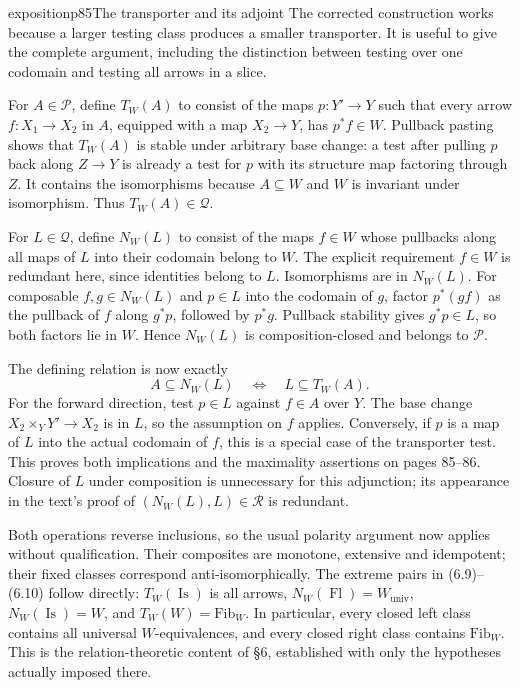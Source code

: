 \begin{dcomment}{exposition}{p85}{The transporter and its adjoint}
The corrected construction works because a larger testing class produces a smaller transporter. It is useful to give the complete argument, including the distinction between testing over one codomain and testing all arrows in a slice.

For $A\in\mathcal P$, define $T_W(A)$ to consist of the maps $p:Y'\to Y$ such that every arrow $f:X_1\to X_2$ in $A$, equipped with a map $X_2\to Y$, has $p^*f\in W$. Pullback pasting shows that $T_W(A)$ is stable under arbitrary base change: a test after pulling $p$ back along $Z\to Y$ is already a test for $p$ with its structure map factoring through $Z$. It contains the isomorphisms because $A\subseteq W$ and $W$ is invariant under isomorphism. Thus $T_W(A)\in\mathcal Q$.

For $L\in\mathcal Q$, define $N_W(L)$ to consist of the maps $f\in W$ whose pullbacks along all maps of $L$ into their codomain belong to $W$. The explicit requirement $f\in W$ is redundant here, since identities belong to $L$. Isomorphisms are in $N_W(L)$. For composable $f,g\in N_W(L)$ and $p\in L$ into the codomain of $g$, factor $p^*(gf)$ as the pullback of $f$ along $g^*p$, followed by $p^*g$. Pullback stability gives $g^*p\in L$, so both factors lie in $W$. Hence $N_W(L)$ is composition-closed and belongs to $\mathcal P$.

The defining relation is now exactly
\[
 A\subseteq N_W(L)\quad\Longleftrightarrow\quad L\subseteq T_W(A).
\]
For the forward direction, test $p\in L$ against $f\in A$ over $Y$. The base change $X_2\times_Y Y'\to X_2$ is in $L$, so the assumption on $f$ applies. Conversely, if $p$ is a map of $L$ into the actual codomain of $f$, this is a special case of the transporter test. This proves both implications and the maximality assertions on pages 85--86. Closure of $L$ under composition is unnecessary for this adjunction; its appearance in the text's proof of $(N_W(L),L)\in\mathcal R$ is redundant.

Both operations reverse inclusions, so the usual polarity argument now applies without qualification. Their composites are monotone, extensive and idempotent; their fixed classes correspond anti-isomorphically. The extreme pairs in (6.9)--(6.10) follow directly: $T_W(\operatorname{Is})$ is all arrows, $N_W(\operatorname{Fl})=W_{\mathrm{univ}}$, $N_W(\operatorname{Is})=W$, and $T_W(W)=\mathrm{Fib}_W$. In particular, every closed left class contains all universal $W$-equivalences, and every closed right class contains $\mathrm{Fib}_W$. This is the relation-theoretic content of \S6, established with only the hypotheses actually imposed there.
\end{dcomment}

